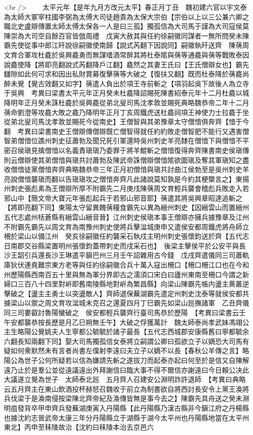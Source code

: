 <br />
　　太平元年【是年九月方改元太平】春正月丁丑　魏初建六官以宇文泰為太師大冢宰柱國李弼為太傅大司徒趙貴為太保大宗伯【宗伯以上以三公兼六卿之職北史盧辯傳置太師太傅太保各一人是曰三孤】獨孤信為大司馬于謹為大司寇侯莫陳崇為大司空自餘百官皆倣周禮　戊寅大赦其與任約徐嗣徽同謀者一無所問癸未陳霸先使從事中郎江旰說徐嗣徽使南歸【說式芮翻下因說同】嗣徽執旰送齊　陳蒨周文育合軍攻杜龕於吳興龕勇而無謀嗜酒常醉其將杜泰隂與蒨等通龕與蒨等戰敗泰因說龕使降【將即亮翻說式芮翻降戶江翻】龕然之其妻王氏曰【王氏僧辯女也】霸先讎隙如此何可求和因出私財賞募復擊蒨等大破之【復扶又翻】既而杜泰降於蒨龕尚醉未覺【覺古效翻又如字】蒨遣人負出於項王寺前斬之【項羽起吳下故後人為立寺于吳興　考異曰梁書太平元年正月癸未杜龕降詔賜死陳書紹泰元年十二月杜龕以城降明年正月癸未誅杜龕於吳興龕從弟北叟司馬沈孝敦並賜死典略魏恭帝二年十二月蒨命劉澄等攻龕大敗之龕乃降明年正月丁亥周鐵虎送杜龕祠項王神使力士拉龕于坐從弟北叟司馬沈孝敦並賜死今從南史】王僧智與其弟豫章太守僧愔俱奔齊【愔于今翻　考異曰梁書南史王僧辯傳僧辯既亡僧智得就任約約敗走僧智肥不能行又遇害僧智弟僧愔位譙州刺史征蕭勃及聞兄死引軍還時吳州刺史羊亮隸在僧愔下與僧愔不平密召侯瑱見擒僧愔以名義責瑱瑱乃委罪于將羊鯤斬之僧愔復得奔齊陳書南史侯瑱傳則云僧辯使其弟僧愔與瑱共討蕭勃及陳武帝誅僧辯僧愔隂欲圖瑱及奪其軍瑱知之盡收僧愔徒黨僧愔奔齊典略魏恭帝三年正月初僧愔與瑱共討曲江侯勃至是吳州刺史羊亮說僧愔襲瑱而翻以告瑱瑱攻之僧愔奔齊凡此諸說莫知孰是今約其梗槩言之】東揚州刺史張彪素為王僧辯所厚不附霸先二月庚戌陳蒨周文育輕兵襲會稽彪兵敗走入若邪山中【簡文帝大寶元年張彪起兵于若邪山邪音耶】蒨遣其將吳興章昭達追斬之【將即亮翻下同】東陽太守留異餽蒨糧食霸先以異為縉州刺史【因縉雲山而置縉州五代志處州栝蒼縣有縉雲山縉音晉】江州刺史侯瑱本事王僧辯亦擁兵據豫章及江州不附霸先霸先以周文育為南豫州刺史使將兵擊湓城庚申又遣侯安都周鐵虎將舟師立柵於梁山以備江州　癸亥徐嗣徽任約襲采石執戍主明州刺史張懷鈞送於齊【五代志日南郡交谷縣梁置明州張懷鈞蓋帶刺史而戌采石也】　後梁主擊侯平於公安平與長沙王韶引兵還長沙王琳遣平鎭巴州三月壬午詔雜用古今錢　戊戌齊遣儀同三司蕭軌庫狄伏連堯難宗東方老等與任約徐嗣徽合兵十萬入寇出柵口【柵口柵江口也在今和州歷陽縣西南百五十里與無為軍分界即古之濡須口宋白曰廬州東南至柵口今謂之新婦口三百八十四里對㟁即舊南陵縣地對㟁為繁昌縣】向梁山陳霸先帳内盪主黄叢逆擊破之【盪主主勇士以突盪敵人】齊師退保蕪湖霸先遣定州刺史沈泰等就侯安都共據梁山以禦之周文育攻湓城未克召之還夏四月丁巳霸先如梁山廵撫諸軍　乙丑齊儀同三司婁叡討魯陽蠻破之　侯安都輕兵襲齊行臺司馬恭於歷陽　【考異曰梁書云壬午安都襲恭按長歷是月乙巳朔無壬午】大破之俘獲萬計　魏太師泰尚孝武妹馮翊公主生略陽公覺姚夫人生寧都公毓毓於諸子最長【五代志西城郡安康縣舊曰寧都毓余六翻長知兩翻下同】娶大司馬獨孤信女泰將立嗣謂公卿曰孤欲立子以嫡恐大司馬有疑如何衆默然未有言者尚書左僕射李遠曰夫立子以嫡不以長【春秋公羊傳之言】略陽公為世子公何所疑若以信為嫌請先斬之遂拔刀而起泰亦起曰何至於是信又自陳解遠乃止於是羣公並從遠議遠出外拜謝信曰臨大事不得不爾信亦謝遠曰今日賴公决此大議遂立覺為世子　太師泰北廵　五月齊人召建安公淵明詐許退師　【考異曰典略云五月齊主在東山飲酒投杯赫怒召魏收于前立為制書欲自將西討長安令上黨王渙將兵伐梁于是渙南侵按梁陳北齊帝紀及渙傳皆無是事今去之】陳霸先具舟送之癸未淵明疽發背卒甲申齊兵發蕪湖庚寅入丹陽縣【此丹陽縣乃漢古縣非今鎭江府之丹楊縣也據沈約志晉武帝太康三年分丹陽縣立于湖縣于湖今太平州也丹陽縣地當在太平州東北】丙申至秣陵故治【沈約曰秣陵本治去京邑六